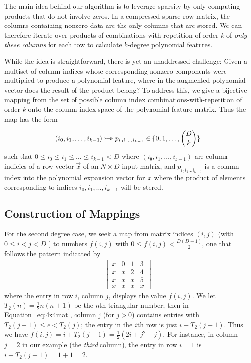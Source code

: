 \documentclass{article} %
\begin{document}
The main idea behind our algorithm is to leverage sparsity by only computing products that do not involve zeros.
In a compressed sparse row matrix, the columns containing nonzero data are the only columns that are stored.
We can therefore iterate over products of combinations with repetition of order $k$ of \emph{only these columns} for each row to calculate $k$-degree polynomial features.

While the idea is straightforward, there is yet an unaddressed challenge:
Given a multiset of column indices whose corresponding nonzero components were multiplied to produce a polynomial feature, where in the augmented polynomial vector does the result of the product belong?
To address this, we give a bijective mapping from the set of possible column index combinations-with-repetition of order $k$ onto the column index space of the polynomial feature matrix. Thus the map has the form

\begin{equation}
(i_0, i_1, \dots, i_{k-1}) \rightarrowtail \hspace{-1.9ex} \twoheadrightarrow p_{i_0i_1 \dots i_{k-1}} \in \{0,1,\dots,\binom{D}{k}\} 
\end{equation}
such that $ 0 \le i_0 \le i_1 \le \dots \le i_{k-1} < D$
where $(i_0, i_1, \dots, i_{k-1})$ are column indicies of a row vector $\vec{x}$ of an $N \times D$ input matrix, and $p_{i_0i_1 \dots i_{k-1}}$ is a column index into the polynomial expansion vector for $\vec{x}$ where the product of elements corresponding to indices $i_0, i_1, \dots, i_{k-1}$ will be stored.

\subsection{Construction of Mappings}

For the second degree case, we seek a map from matrix indices $(i, j)$ (with $0 \le i < j < D$ ) to numbers $f(i, j)$ with $0 \le f(i, j) < \frac{D(D-1)}{2}$, one that follows the pattern indicated by 
\begin{align}
\begin{bmatrix}
x & 0 & 1 & 3 \\
x & x & 2 & 4 \\
x & x & x & 5 \\
x & x & x & x
\end{bmatrix}
\label{eq:4x4mat}
\end{align}
where the entry in row $i$, column $j$, displays the value $f(i, j)$. We let $T_2(n) = \frac{1}{2} n(n+1)$ 
be the $n$th triangular number; then in Equation~\ref{eq:4x4mat}, column $j$ (for $j > 0$) contains entries with  
$T_2(j-1) \le e < T_2(j)$; the entry in the $i$th row is just $i + T_2(j-1)$. Thus we have
$
f(i, j) 
= i + T_2(j-1) =  \frac{1}{2}(2i + j^2-j).$
For instance, in column $j = 2$ in our example (the \emph{third} column), the entry in row $i = 1$ is 
$i + T_2(j-1) = 1 + 1 = 2$. 
\end{document}
